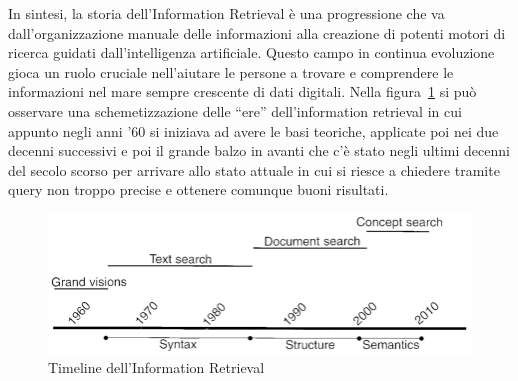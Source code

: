 In sintesi, la storia dell'Information Retrieval è una progressione che va dall'organizzazione manuale delle informazioni alla creazione di potenti motori di ricerca guidati dall'intelligenza artificiale. Questo campo in continua evoluzione gioca un ruolo cruciale nell'aiutare le persone a trovare e comprendere le informazioni nel mare sempre crescente di dati digitali. Nella figura~\ref{fig:timelineir} si può osservare una schemetizzazione delle ``ere'' dell'information retrieval in cui appunto negli anni '60 si iniziava ad avere le basi teoriche, applicate poi nei due decenni successivi e poi il grande balzo in avanti che c'è stato negli ultimi decenni del secolo scorso per arrivare allo stato attuale in cui si riesce a chiedere tramite query non troppo precise e ottenere comunque buoni risultati.
\begin{figure}
    \includegraphics[width=0.75\pdfpagewidth]{images/timelineir.png}
    \caption{Timeline dell'Information Retrieval} \label{fig:timelineir}
\end{figure}